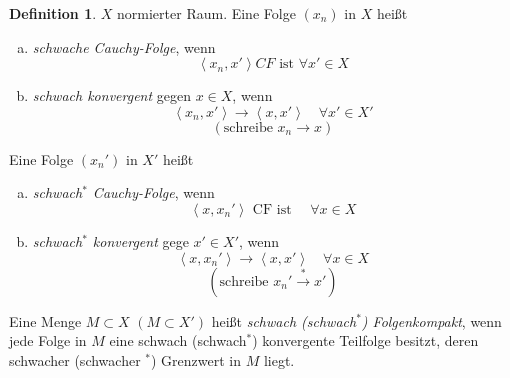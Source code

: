 \documentclass[ngerman]{report}
\theoremstyle{plain}%
\theoremstyle{definition}%
\newtheorem{definition}[thm]{Definition}
\theoremstyle{myStyle}
\newcommand{\fop}[1]{\left \langle #1 \right \rangle} %
\begin{document}
	\begin{definition}
		$X$ normierter Raum. 
		Eine Folge $(x_n)$ in $X$ heißt 
			\begin{enumerate}[a)]
				\item \textit{schwache Cauchy-Folge}, wenn 
					$$ \fop{x_n,x'} CF \text{ ist }  \forall x' \in X$$
				\item \textit{schwach konvergent} gegen $x\in X$, wenn
					$$ \fop{x_n, x'} \to \fop{x,x'} \quad \forall x' \in X'$$
					$$(\text{schreibe } x_n \longrightarrow x )$$
			\end{enumerate}
		Eine Folge $(x_n')$ in $X'$ heißt
			\begin{enumerate}[a)]
				\item \textit{schwach$^*$ Cauchy-Folge}, wenn 
					$$ \fop{x,x_n'} \text{ CF ist } \quad \forall x\in X$$
				\item \textit{schwach$^*$ konvergent} gege $x' \in X'$, wenn
					$$ \fop{x,x_n'} \to \fop{x,x'} \quad \forall x\in X $$
					$$(\text{schreibe } x_n' \overset{*}{\longrightarrow} x')$$
			\end{enumerate}
			Eine Menge $M\subset X$ $(M \subset X')$ heißt \textit{schwach (schwach$^*$) Folgenkompakt}, wenn jede Folge in $M$ eine schwach (schwach$^*$) konvergente Teilfolge besitzt, deren schwacher (schwacher $^*$) Grenzwert in $M$ liegt.
		

	\end{definition}
\newcommand{\limesinf}{\underset{n\to\infty}{\lim\inf}}
\end{document}
